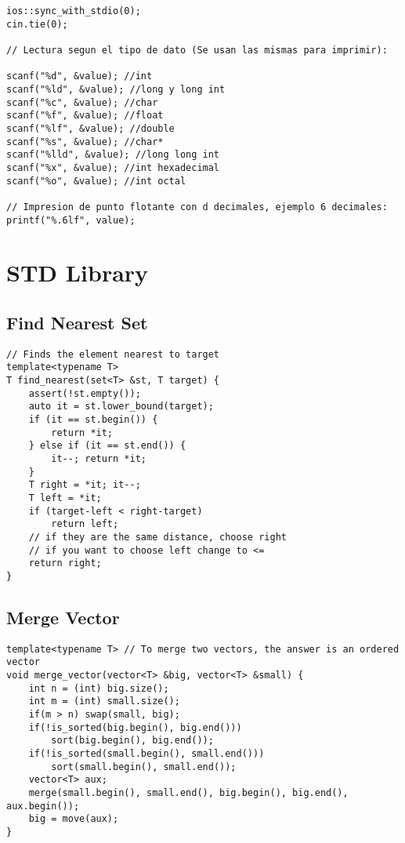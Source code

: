 \documentclass[10pt,letterpaper,twocolumn,twosided]{article}
\begin{document}
\begin{lstlisting}
ios::sync_with_stdio(0);
cin.tie(0);

// Lectura segun el tipo de dato (Se usan las mismas para imprimir):

scanf("%d", &value); //int
scanf("%ld", &value); //long y long int
scanf("%c", &value); //char 
scanf("%f", &value); //float
scanf("%lf", &value); //double
scanf("%s", &value); //char*
scanf("%lld", &value); //long long int
scanf("%x", &value); //int hexadecimal
scanf("%o", &value); //int octal

// Impresion de punto flotante con d decimales, ejemplo 6 decimales:
printf("%.6lf", value);
\end{lstlisting}



\section{STD Library}

\subsection{Find Nearest Set}
\begin{lstlisting}
// Finds the element nearest to target
template<typename T>
T find_nearest(set<T> &st, T target) {
    assert(!st.empty());
    auto it = st.lower_bound(target);
    if (it == st.begin()) {
        return *it;
    } else if (it == st.end()) {
        it--; return *it;
    }
    T right = *it; it--;
    T left = *it;
    if (target-left < right-target) 
        return left;
    // if they are the same distance, choose right
    // if you want to choose left change to <=
    return right;
}
\end{lstlisting}


\subsection{Merge Vector}
\begin{lstlisting}
template<typename T> // To merge two vectors, the answer is an ordered vector
void merge_vector(vector<T> &big, vector<T> &small) {
    int n = (int) big.size();
    int m = (int) small.size();
    if(m > n) swap(small, big);
    if(!is_sorted(big.begin(), big.end()))
        sort(big.begin(), big.end());
    if(!is_sorted(small.begin(), small.end()))
        sort(small.begin(), small.end());
    vector<T> aux;
    merge(small.begin(), small.end(), big.begin(), big.end(), aux.begin());
    big = move(aux);
}
\end{lstlisting}
\end{document}
